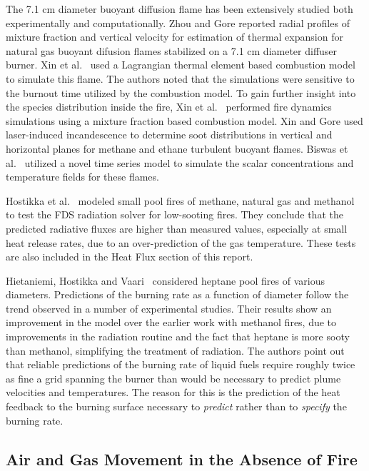 The 7.1 cm diameter buoyant diffusion flame has been extensively studied both experimentally and computationally. Zhou and Gore \cite{Zhou:CS1998} reported radial profiles of mixture fraction and vertical velocity for estimation of thermal expansion for natural gas buoyant difusion flames stabilized on a 7.1 cm diameter diffuser burner. Xin et al.~\cite{Xin:CSS2002} used a Lagrangian thermal element based combustion model to simulate this flame. The authors noted that the simulations were sensitive to the burnout time utilized by the combustion model. To gain further insight into the species distribution inside the fire, Xin et al.~\cite{Xin:CF2005} performed fire dynamics simulations using a mixture fraction based combustion model. Xin and Gore \cite{Xin:CS2005} used laser-induced incandescence to determine soot distributions in vertical and horizontal planes for methane and ethane turbulent buoyant flames. Biswas et al.~\cite{Biswas:CS2007} utilized a novel time series model to simulate the scalar concentrations and temperature fields for these flames.

Hostikka et al.~\cite{Hostikka:3} modeled small pool fires of methane, natural gas and methanol to test the FDS radiation solver for low-sooting fires. They conclude that the predicted radiative fluxes are higher than measured values, especially at small heat release rates, due to an over-prediction of the gas temperature. These tests are also included in the Heat Flux section of this report.

Hietaniemi, Hostikka and Vaari~\cite{Hietaniemi:1} considered heptane pool fires of various diameters. Predictions of the burning rate as a function of diameter follow the trend observed in a number of experimental studies. Their results show an improvement in the model over the earlier work with methanol fires, due to improvements in the radiation routine and the fact that heptane is more sooty than methanol, simplifying the treatment of radiation.  The authors point out that reliable predictions of the burning rate of liquid fuels require roughly twice as fine a grid spanning the burner than would be necessary to predict plume velocities and temperatures. The reason for this is the prediction of the heat feedback to the burning surface necessary to {\em predict} rather than to {\em specify} the burning rate.


\subsection{Air and Gas Movement in the Absence of Fire}

